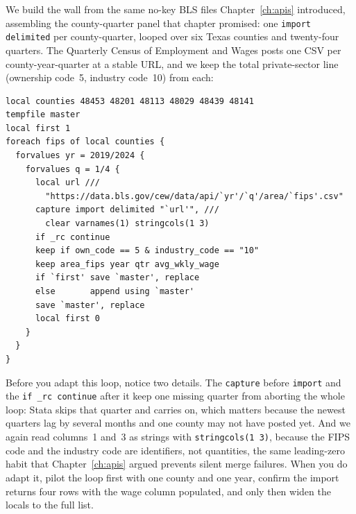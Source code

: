 We build the wall from the same no-key BLS files Chapter~\ref{ch:apis} introduced, assembling the county-quarter panel that chapter promised: one \texttt{import delimited} per county-quarter, looped over six Texas counties and twenty-four quarters. The Quarterly Census of Employment and Wages posts one CSV per county-year-quarter at a stable URL, and we keep the total private-sector line (ownership code~5, industry code~10) from each:
\par
{\footnotesize
\begin{verbatim}
local counties 48453 48201 48113 48029 48439 48141
tempfile master
local first 1
foreach fips of local counties {
  forvalues yr = 2019/2024 {
    forvalues q = 1/4 {
      local url ///
        "https://data.bls.gov/cew/data/api/`yr'/`q'/area/`fips'.csv"
      capture import delimited "`url'", ///
        clear varnames(1) stringcols(1 3)
      if _rc continue
      keep if own_code == 5 & industry_code == "10"
      keep area_fips year qtr avg_wkly_wage
      if `first' save `master', replace
      else       append using `master'
      save `master', replace
      local first 0
    }
  }
}
\end{verbatim}
}
Before you adapt this loop, notice two details. The \texttt{capture} before \texttt{import} and the \texttt{if \_rc continue} after it keep one missing quarter from aborting the whole loop: Stata skips that quarter and carries on, which matters because the newest quarters lag by several months and one county may not have posted yet. And we again read columns~1 and~3 as strings with \texttt{stringcols(1 3)}, because the FIPS code and the industry code are identifiers, not quantities, the same leading-zero habit that Chapter~\ref{ch:apis} argued prevents silent merge failures. When you do adapt it, pilot the loop first with one county and one year, confirm the import returns four rows with the wage column populated, and only then widen the locals to the full list.


